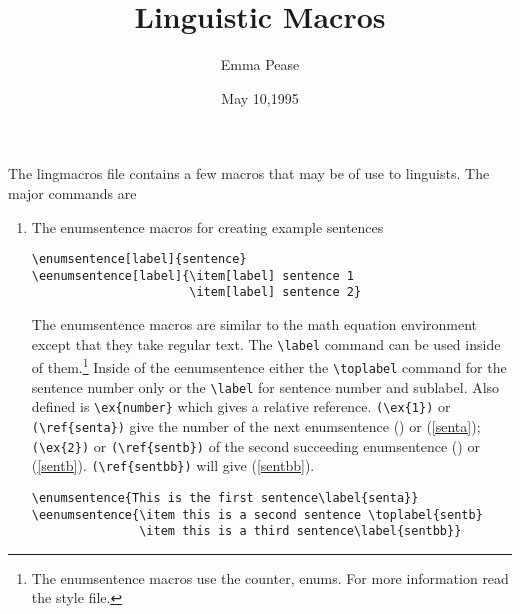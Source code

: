 
\title{Linguistic Macros}
\author{Emma Pease}
\date{May 10,1995}



\maketitle

The lingmacros file contains a few macros that may be of use to
linguists.  The major commands are
\begin{enumerate}
\item The enumsentence macros for creating example sentences
\begin{center}
\begin{verbatim}
\enumsentence[label]{sentence}
\eenumsentence[label]{\item[label] sentence 1
                      \item[label] sentence 2}
\end{verbatim}
\end{center}
 The enumsentence macros are similar to the math equation environment
except that they take regular text.  The \verb+\label+ command can be
used inside of them.\footnote{The enumsentence macros use the counter,
enums.  For more information read the style file.} Inside of the
eenumsentence either the \verb+\toplabel+ command for the sentence
number only or the \verb+\label+ for sentence number and sublabel.
Also defined is
\verb+\ex{number}+ which gives a relative reference.  \verb+(\ex{1})+
or \verb+(\ref{senta})+ give the number of the next enumsentence ()
or (\ref{senta}); \verb+(\ex{2})+ or \verb+(\ref{sentb})+ of the second
succeeding enumsentence () or (\ref{sentb}).
\verb+(\ref{sentbb})+ will give (\ref{sentbb}).
\begin{center}
\begin{verbatim}
\enumsentence{This is the first sentence\label{senta}}
\eenumsentence{\item this is a second sentence \toplabel{sentb}
               \item this is a third sentence\label{sentbb}}
\end{verbatim}
\end{center}



\end{enumerate}
